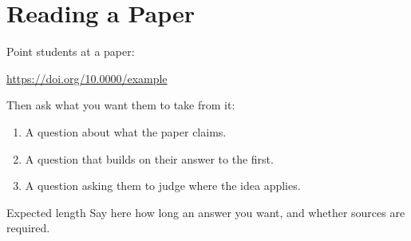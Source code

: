 \section{Reading a Paper}

Point students at a paper:

\url{https://doi.org/10.0000/example}

Then ask what you want them to take from it:

\begin{enumerate}
    \item A question about what the paper claims.
    \item A question that builds on their answer to the first.
    \item A question asking them to judge where the idea applies.
\end{enumerate}

\begin{neobox}[neotitlefont=\pixelfont]{Expected length}
    Say here how long an answer you want, and whether sources are required.
\end{neobox}
